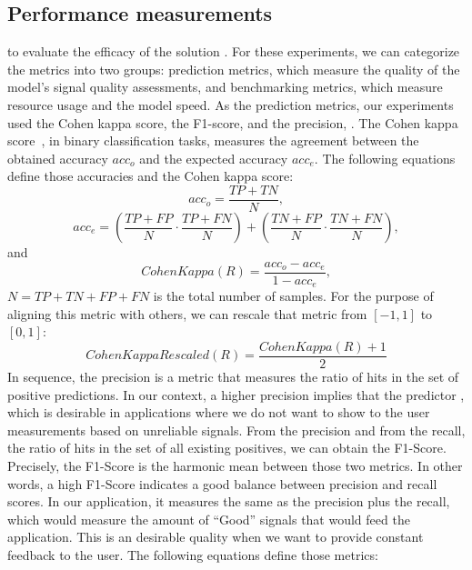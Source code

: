 \subsection{Performance measurements}

 to evaluate the efficacy of the solution . For these experiments, we can categorize the metrics into two groups: prediction metrics, which measure the quality of the model's signal quality assessments, and benchmarking metrics, which measure resource usage and the model speed. As the prediction metrics, our experiments used the Cohen kappa score, the F1-score, and the precision, . The Cohen kappa score~\cite{CohenKappa}, in binary classification tasks, measures the agreement between the obtained accuracy $acc_o$ and the expected accuracy $acc_e$. The following equations define those accuracies and the Cohen kappa score:
\begin{equation} 
acc_o = \frac{TP+TN}{N},
\end{equation}
\begin{equation}
acc_e  = \left(\frac{TP+FP}{N} \cdot \frac{TP+FN}{N}\right) + \left(\frac{TN+FP}{N} \cdot \frac{TN+FN}{N}\right),
\end{equation}
and
\begin{equation} \label{eq:Cohen kappa}
CohenKappa(R)  = \frac{acc_o - acc_e}{1 - acc_e}, 
\end{equation}  
\noindent {} $N=TP+TN+FP+FN$ is the total number of samples. For the purpose of aligning this metric with others, we can rescale that metric from $[-1,1]$ to $[0,1]$:
\begin{equation}
CohenKappaRescaled(R) = \frac{CohenKappa(R)+1}{2} 
\end{equation}  
In sequence, the precision is a metric that measures the ratio of hits in the set of positive predictions. In our context, a higher precision implies that the predictor , which is desirable in applications where we do not want to show to the user measurements based on unreliable signals. From the precision and from the recall, the ratio of hits in the set of all existing positives, we can obtain the F1-Score. Precisely, the F1-Score is the harmonic mean between those two metrics. In other words, a high F1-Score indicates a good balance between precision and recall scores. In our application, it measures the same as the precision plus the recall, which would measure the amount of ``Good'' signals that would feed the application. This is an desirable quality when we want to provide constant feedback to the user. The following equations define those metrics:
